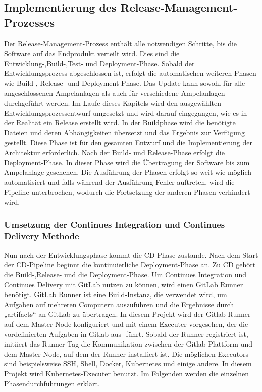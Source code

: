 \subsection{Implementierung des Release-Management-Prozesses}

Der Release-Management-Prozess enthält alle notwendigen Schritte, bis die Software auf das Endprodukt verteilt wird. Dies sind die Entwicklung-,Build-,Test- und Deployment-Phase. Sobald der Entwicklungsprozess abgeschlossen ist, erfolgt die automatischen weiteren Phasen wie Build-, Release- und Deployment-Phase. Das Update kann sowohl für alle angeschlossenen Ampelanlagen als auch für verschiedene Ampelanlagen durchgeführt werden. 
\newline\newline
Im Laufe dieses Kapitels wird den ausgewählten Entwicklungsprozessentwurf umgesetzt und wird darauf eingegangen, wie es in der Realität ein Release erstellt wird.
In der Buildphase wird die benötigte Dateien und deren Abhängigkeiten übersetzt und das Ergebnis zur Verfügung gestellt. Diese Phase ist für den gesamten Entwurf und die Implementierung der Architektur erforderlich. Nach der Build- und Release-Phase erfolgt die Deployment-Phase. In dieser Phase wird die Übertragung der Software bis zum Ampelanlage geschehen. Die Ausführung der Phasen erfolgt so weit wie möglich automatisiert und falls während der Ausführung Fehler auftreten, wird die Pipeline unterbrochen, wodurch die Fortsetzung der anderen Phasen verhindert wird.

\subsubsection{Umsetzung der Continues Integration und Continues Delivery Methode}

Nun nach der Entwicklungsphase kommt die \ac{CD}-Phase zustande. Nach dem Start der \ac{CD}-Pipeline beginnt die kontinuierliche Deployment-Phase an. Zu \ac{CD} gehört die Build-,Release- und die Deployment-Phase. Um Continues Integration und Continues Delivery mit GitLab nutzen zu können, wird einen GitLab Runner benötigt. GitLab Runner ist eine Build-Instanz, die verwendet wird, um Aufgaben auf mehreren Computern auszuführen und die Ergebnisse durch „artifacts“ an GitLab zu übertragen.
\newline\newline
In diesem Projekt wird der Gitlab Runner auf dem Master-Node konfiguriert und mit einem Executer vorgesehen, der die vordefinierten Aufgaben in Gitlab aus-
führt. Sobald der Runner registriert ist, initiiert das Runner Tag die Kommunikation zwischen der Gitlab-Plattform und dem Master-Node, auf dem der Runner installiert ist. Die möglichen Executors sind beispielsweise SSH, Shell, Docker, Kubernetes und einige andere. In diesem Projekt wird Kubernetes-Executer benutzt.
\newline\newline
Im
Folgenden werden die einzelnen Phasendurchführungen erklärt.
